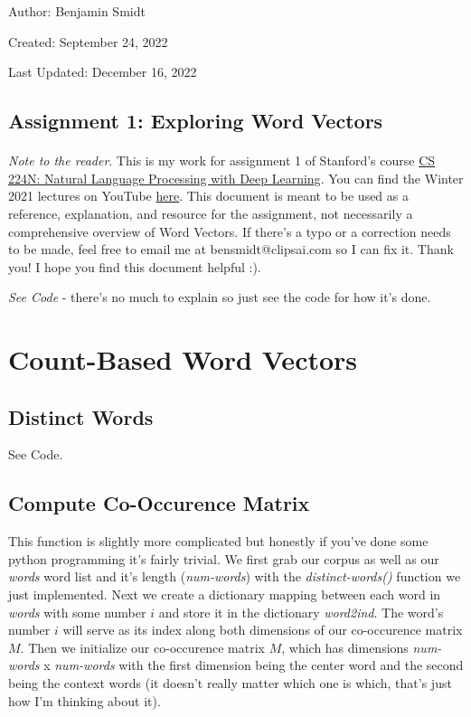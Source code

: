 \documentclass[12pt]{article}
\begin{document}
\noindent Author: Benjamin Smidt

\noindent Created: September 24, 2022

\noindent Last Updated: December 16, 2022
\begin{center}
\section*{Assignment 1: Exploring Word Vectors}
\end{center}

\paragraph{} \emph{Note to the reader}. This is my work for assignment 1 of Stanford's course
\href{https://web.stanford.edu/class/cs224n/}{CS 224N: Natural Language Processing with Deep Learning}. 
You can find the Winter 2021 lectures on YouTube \href{https://www.youtube.com/playlist?list=PLoROMvodv4rOSH4v6133s9LFPRHjEmbmJ}{here}.
This document is meant to be used as a reference, explanation, and resource for the assignment, 
not necessarily a comprehensive overview of Word Vectors. If there's a typo or a correction 
needs to be made, feel free to email me at bensmidt@clipsai.com so I can fix it. 
Thank you! I hope you find this document helpful :). 

\emph{See Code} - there's no much to explain so just see the code for how it's done.

\tableofcontents

\newpage

\section{Count-Based Word Vectors}

\subsection{Distinct Words}
See Code.

\subsection{Compute Co-Occurence Matrix}
This function is slightly more complicated but honestly if you've done some python programming it's fairly 
trivial. We first grab our corpus as well as our \emph{words} word list and it's length (\emph{num-words}) 
with the \emph{distinct-words()} function we just implemented. Next we create a dictionary mapping between 
each word in \emph{words} with some number $i$ and store it in the dictionary \emph{word2ind}. The word's 
number $i$ will serve as its index along both dimensions of our co-occurence matrix $M$. Then we 
initialize our co-occurence matrix $M$, which has dimensions \emph{num-words} x \emph{num-words} with the 
first dimension being the center word and the second being the context words (it doesn't really matter which
one is which, that's just how I'm thinking about it).
\end{document}
